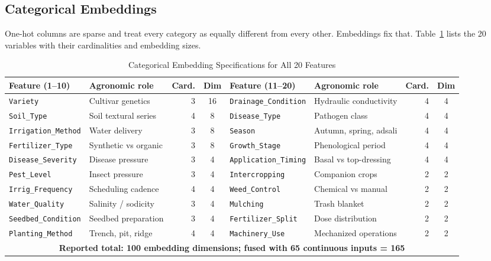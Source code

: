 \documentclass[conference,10pt,letterpaper]{IEEEtran}
\begin{document}
\subsection{Categorical Embeddings}
\label{sec:embeddings}
One-hot columns are sparse and treat every category as equally different from every other. Embeddings fix that. Table~\ref{tab:embeddings} lists the 20 variables with their cardinalities and embedding sizes.

\begin{table}[t]
\caption{Categorical Embedding Specifications for All 20 Features}
\label{tab:embeddings}
\centering
\footnotesize
\setlength{\tabcolsep}{4pt}
\begin{tabular*}{\textwidth}{@{\extracolsep{\fill}}llrc@{\hspace{2em}}llrc@{}}
\toprule
\textbf{Feature (1--10)} & \textbf{Agronomic role} & \textbf{Card.} & \textbf{Dim} &
\textbf{Feature (11--20)} & \textbf{Agronomic role} & \textbf{Card.} & \textbf{Dim} \\
\midrule
\texttt{Variety}            & Cultivar genetics       & 3 & 16 & \texttt{Drainage\_Condition}  & Hydraulic conductivity & 4 & 4 \\
\texttt{Soil\_Type}         & Soil textural series    & 4 & 8  & \texttt{Disease\_Type}        & Pathogen class         & 4 & 4 \\
\texttt{Irrigation\_Method} & Water delivery          & 3 & 8  & \texttt{Season}               & Autumn, spring, adsali & 4 & 4 \\
\texttt{Fertilizer\_Type}   & Synthetic vs organic    & 3 & 8  & \texttt{Growth\_Stage}        & Phenological period    & 4 & 4 \\
\texttt{Disease\_Severity}  & Disease pressure        & 3 & 4  & \texttt{Application\_Timing}  & Basal vs top-dressing  & 4 & 4 \\
\texttt{Pest\_Level}        & Insect pressure         & 3 & 4  & \texttt{Intercropping}        & Companion crops        & 2 & 2 \\
\texttt{Irrig\_Frequency}   & Scheduling cadence      & 4 & 4  & \texttt{Weed\_Control}        & Chemical vs manual     & 2 & 2 \\
\texttt{Water\_Quality}     & Salinity / sodicity     & 3 & 4  & \texttt{Mulching}             & Trash blanket          & 2 & 2 \\
\texttt{Seedbed\_Condition} & Seedbed preparation     & 3 & 4  & \texttt{Fertilizer\_Split}    & Dose distribution      & 2 & 2 \\
\texttt{Planting\_Method}   & Trench, pit, ridge      & 4 & 4  & \texttt{Machinery\_Use}       & Mechanized operations  & 2 & 2 \\
\midrule
\multicolumn{8}{c}{\textbf{Reported total: 100 embedding dimensions; fused with 65 continuous inputs = 165}} \\
\bottomrule
\end{tabular*}
\end{table}
\end{document}
